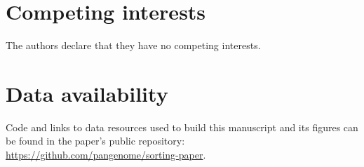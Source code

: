 \documentclass{bioinfo}
\theoremstyle{definition}
\begin{document}
\section*{Competing interests}
The authors declare that they have no competing interests.

\section*{Data availability}

Code and links to data resources used to build this manuscript and its figures can be found in the paper's public repository: \url{https://github.com/pangenome/sorting-paper}.




\end{document}
